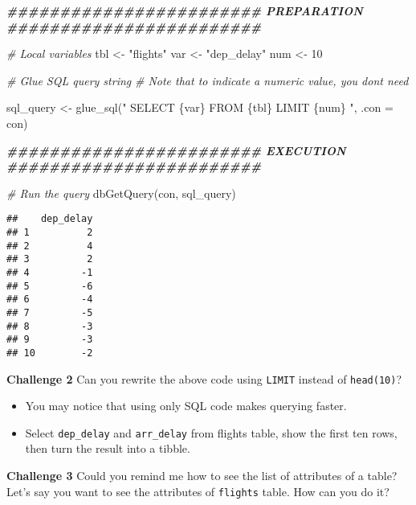 \documentclass[
]{book}
\newenvironment{Shaded}{\begin{snugshade}}{\end{snugshade}}
\newcommand{\AttributeTok}[1]{\textcolor[rgb]{0.77,0.63,0.00}{#1}}
\newcommand{\CommentTok}[1]{\textcolor[rgb]{0.56,0.35,0.01}{\textit{#1}}}
\newcommand{\DecValTok}[1]{\textcolor[rgb]{0.00,0.00,0.81}{#1}}
\newcommand{\DocumentationTok}[1]{\textcolor[rgb]{0.56,0.35,0.01}{\textbf{\textit{#1}}}}
\newcommand{\FunctionTok}[1]{\textcolor[rgb]{0.00,0.00,0.00}{#1}}
\newcommand{\NormalTok}[1]{#1}
\newcommand{\OtherTok}[1]{\textcolor[rgb]{0.56,0.35,0.01}{#1}}
\newcommand{\StringTok}[1]{\textcolor[rgb]{0.31,0.60,0.02}{#1}}
\begin{document}
\begin{Shaded}
\begin{Highlighting}[]
\DocumentationTok{\#\#\#\#\#\#\#\#\#\#\#\#\#\#\#\#\#\#\#\#\#\#\#\# PREPARATION \#\#\#\#\#\#\#\#\#\#\#\#\#\#\#\#\#\#\#\#\#\#\#\#}

\CommentTok{\# Local variables }
\NormalTok{tbl }\OtherTok{\textless{}{-}} \StringTok{"flights"}
\NormalTok{var }\OtherTok{\textless{}{-}} \StringTok{"dep\_delay"}
\NormalTok{num }\OtherTok{\textless{}{-}} \DecValTok{10}

\CommentTok{\# Glue SQL query string }
\CommentTok{\# Note that to indicate a numeric value, you don\textquotesingle{}t need \textasciigrave{}\textasciigrave{}}

\NormalTok{sql\_query }\OtherTok{\textless{}{-}} \FunctionTok{glue\_sql}\NormalTok{(}\StringTok{"}
\StringTok{  SELECT \{\textasciigrave{}var\textasciigrave{}\}}
\StringTok{  FROM \{\textasciigrave{}tbl\textasciigrave{}\}}
\StringTok{  LIMIT \{num\} }
\StringTok{  "}\NormalTok{, }\AttributeTok{.con =}\NormalTok{ con)}

\DocumentationTok{\#\#\#\#\#\#\#\#\#\#\#\#\#\#\#\#\#\#\#\#\#\#\#\# EXECUTION \#\#\#\#\#\#\#\#\#\#\#\#\#\#\#\#\#\#\#\#\#\#\#\#}

\CommentTok{\# Run the query }
\FunctionTok{dbGetQuery}\NormalTok{(con, sql\_query)}
\end{Highlighting}
\end{Shaded}

\begin{verbatim}
##    dep_delay
## 1          2
## 2          4
## 3          2
## 4         -1
## 5         -6
## 6         -4
## 7         -5
## 8         -3
## 9         -3
## 10        -2
\end{verbatim}

\textbf{Challenge 2}
Can you rewrite the above code using \texttt{LIMIT} instead of \texttt{head(10)}?

\begin{itemize}
\item
  You may notice that using only SQL code makes querying faster.
\item
  Select \texttt{dep\_delay} and \texttt{arr\_delay} from flights table, show the first ten rows, then turn the result into a tibble.
\end{itemize}

\textbf{Challenge 3}
Could you remind me how to see the list of attributes of a table? Let's say you want to see the attributes of \texttt{flights} table. How can you do it?
\end{document}
